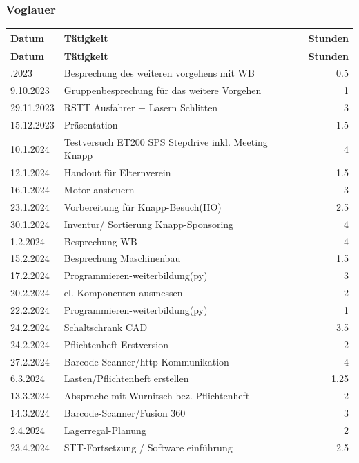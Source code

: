 \subsubsection{Voglauer}
\begin{longtable}{|l|p{10cm}|r|}
    \hline
    \textbf{Datum} & \textbf{Tätigkeit} & \textbf{Stunden} \\
    \hline
    \endfirsthead

    \hline
    \textbf{Datum} & \textbf{Tätigkeit} & \textbf{Stunden} \\
    \hline
    \endhead

    \hline
    \endfoot

    \hline
    \endlastfoot
    4.10.2023	&	Besprechung des weiteren vorgehens mit WB	&	0.5	\\
9.10.2023	&	Gruppenbesprechung für das weitere Vorgehen	&	1	\\
29.11.2023	&	RSTT Ausfahrer + Lasern Schlitten	&	3	\\
15.12.2023	&	Präsentation	&	1.5	\\
10.1.2024	&	Testversuch ET200 SPS Stepdrive inkl. Meeting Knapp	&	4	\\
12.1.2024	&	Handout für Elternverein	&	1.5	\\
16.1.2024	&	Motor ansteuern	&	3	\\
23.1.2024	&	Vorbereitung für Knapp-Besuch(HO)	&	2.5	\\
30.1.2024	&	Inventur/ Sortierung Knapp-Sponsoring	&	4	\\
1.2.2024	&	Besprechung WB	&	4	\\
15.2.2024	&	Besprechung Maschinenbau	&	1.5	\\
17.2.2024	&	Programmieren-weiterbildung(py)	&	3	\\
20.2.2024	&	el. Komponenten ausmessen 	&	2	\\
22.2.2024	&	Programmieren-weiterbildung(py)	&	1	\\
24.2.2024	&	Schaltschrank CAD	&	3.5	\\
24.2.2024	&	Pflichtenheft Erstversion	&	2	\\
27.2.2024	&	Barcode-Scanner/http-Kommunikation	&	4	\\
6.3.2024	&	Lasten/Pflichtenheft erstellen	&	1.25	\\
13.3.2024	&	Absprache mit Wurnitsch bez. Pflichtenheft	&	2	\\
14.3.2024	&	Barcode-Scanner/Fusion 360	&	3	\\
2.4.2024	&	Lagerregal-Planung	&	2	\\
23.4.2024	&	STT-Fortsetzung / Software einführung	&	2.5	\\

\end{longtable}

